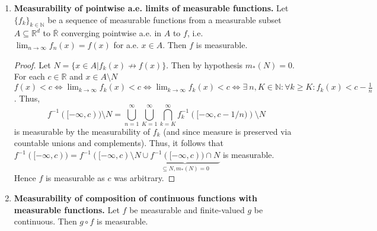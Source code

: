\begin{enumerate}
\begin{enumerate}
	\item For all \( c \in \mathbb{R} \), \( f^{-1}([-\infty, c]) = f^{-1}(\{ x \in \overline{\mathbb{R}} : - \infty \leq x \leq c \} )   \) is measurable.
\end{enumerate}
\begin{proof}\renewcommand{\qedsymbol}{}
\((1 \implies 2)\) follows from \( f^{-1}([c , + \infty]) = f^{-1}\left ( {\bigcap_{k=1}^{\infty} (c - \frac{1}{k} , +\infty] } \right ) = \bigcap_{k=1}^{\infty} f^{-1}((c - \frac{1}{k} , + \infty])     \) and the fact that countable intersections of measurable sets are measurable. (\( 2 \implies 3 \)) follows from \( f^{-1}([-\infty, c)) = f^{-1}(\overline{\mathbb{R}} \setminus [c, +\infty]) = A \setminus f^{-1}((c,+\infty])    \) and the fact that complements of measurable sets are measurable. \( (3 \implies 4) \) follows from \( f^{-1}([-\infty, c]) = \bigcap_{k=1}^{\infty} f^{-1} ([-\infty, c + \frac{1}{k} ))  \) and \( (4 \implies 1) \) follows from \( f^{-1}((c, + \infty]) = A \setminus f^{-1}([-\infty, c])   \).
\end{proof}
\item \textbf{Measurability of pointwise a.e. limits of measurable functions.} Let \( \{ f_k \} _{k \in \mathbb{N} }  \) be a sequence of measurable functions from a measurable subset \( A \subseteq \mathbb{R}^{d}  \) to \( \overline{\mathbb{R}} \) converging pointwise a.e. in \( A \) to \( f \), i.e. \( \lim_{{n} \to {\infty}} f_n(x) = f(x) \) for a.e. \( x \in A \). Then \( f \) is measurable.
	\begin{proof}\renewcommand{\qedsymbol}{}
		Let \( N = \{ x \in A | f_k(x) \not\to f(x) \}  \). Then by hypothesis \( m_*(N) = 0 \). For each \( c \in \mathbb{R} \) and \( x \in A \setminus N \) \( f(x) < c \iff \lim_{{k} \to {\infty}} f_k(x) < c \iff \lim_{{k} \to {\infty}} f_k(x) < c \iff \exists \ n,K \in \mathbb{N} : \forall k \geq K : f_k(x) < c - \frac{1}{n} \). Thus, \[f^{-1}([-\infty,c)) \setminus N = \bigcup_{n=1}^{\infty} \bigcup_{K=1}^{\infty} \bigcap_{k=K}^{\infty} f^{-1}_k\left ( {[-\infty, c - 1 / n)} \right ) \setminus N\] is measurable by the measurability of \( f_k \) (and since measure is preserved via countable unions and complements). Thus, it follows that \( f^{-1}([-\infty,c)) = f^{-1}([-\infty,c)\setminus N \cup \underbrace{f^{-1}([-\infty,c))\cap N}_{\subseteq N, m_*(N) = 0}     \) is measurable. Hence \( f \) is measurable as \( c \) was arbitrary.
	\end{proof}
\item \textbf{Measurability of composition of continuous functions with measurable functions.} Let \( f \) be measurable and finite-valued \( g \) be continuous. Then \( g \circ f \) is measurable.

\end{enumerate}
